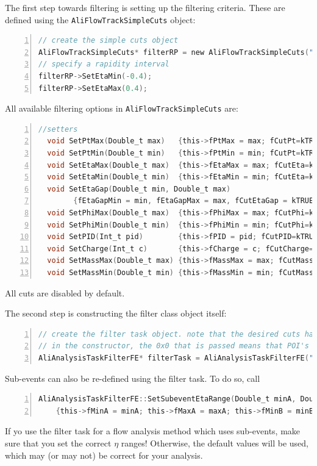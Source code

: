 \documentclass[a4paper]{book}
\numberwithin{equation}{subsection}
\begin{document}
The first step towards filtering is setting up the filtering criteria. These are defined using the \texttt{AliFlowTrackSimpleCuts} object:
\begin{lstlisting}[language=C, numbers=left]
// create the simple cuts object
AliFlowTrackSimpleCuts* filterRP = new AliFlowTrackSimpleCuts("filterRP"); 
// specify a rapidity interval
filterRP->SetEtaMin(-0.4);
filterRP->SetEtaMax(0.4);\end{lstlisting}

All available filtering options in \texttt{AliFlowTrackSimpleCuts} are: 
\begin{lstlisting}[language=C, numbers=left]
  //setters
  void SetPtMax(Double_t max)   {this->fPtMax = max; fCutPt=kTRUE; }
  void SetPtMin(Double_t min)   {this->fPtMin = min; fCutPt=kTRUE;  }
  void SetEtaMax(Double_t max)  {this->fEtaMax = max; fCutEta=kTRUE; }
  void SetEtaMin(Double_t min)  {this->fEtaMin = min; fCutEta=kTRUE; }
  void SetEtaGap(Double_t min, Double_t max)
        {fEtaGapMin = min, fEtaGapMax = max, fCutEtaGap = kTRUE; }
  void SetPhiMax(Double_t max)  {this->fPhiMax = max; fCutPhi=kTRUE; }
  void SetPhiMin(Double_t min)  {this->fPhiMin = min; fCutPhi=kTRUE; }
  void SetPID(Int_t pid)        {this->fPID = pid; fCutPID=kTRUE; }
  void SetCharge(Int_t c)       {this->fCharge = c; fCutCharge=kTRUE; }
  void SetMassMax(Double_t max) {this->fMassMax = max; fCutMass=kTRUE; }
  void SetMassMin(Double_t min) {this->fMassMin = min; fCutMass=kTRUE; }\end{lstlisting}
All cuts are disabled by default. 

The second step is constructing the filter class object itself:
\begin{lstlisting}[language=C, numbers=left]
// create the filter task object. note that the desired cuts have to be passed 
// in the constructor, the 0x0 that is passed means that POI's will not be filtered
AliAnalysisTaskFilterFE* filterTask = AliAnalysisTaskFilterFE("filter task", filterRP, 0x0);\end{lstlisting}
Sub-events can also be re-defined using the filter task. To do so, call
\begin{lstlisting}[language=C, numbers=left]
AliAnalysisTaskFilterFE::SetSubeventEtaRange(Double_t minA, Double_t maxA, Double_t minB, Double_t maxB)
    {this->fMinA = minA; this->fMaxA = maxA; this->fMinB = minB; this->fMaxB = maxB; }\end{lstlisting}
If yo use the filter task for a flow analysis method which uses sub-events, make sure that you set the correct $\eta$ ranges! Otherwise, the default values will be used, which may (or may not) be correct for your analysis. 
\end{document}
